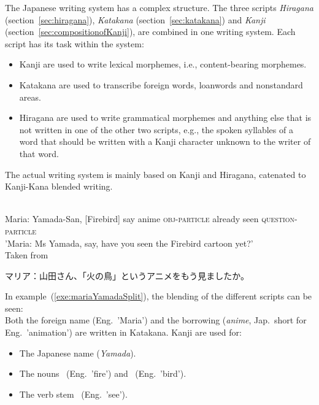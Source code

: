 The Japanese writing system has a complex structure. The three scripts 
\emph{Hiragana} (section~\ref{sec:hiragana}),
\emph{Katakana} (section~\ref{sec:katakana}) and
\emph{Kanji} (section~\ref{sec:compositionofKanji}),
are combined in one writing system. Each script has its task within the system:
\begin{itemize}

  \item Kanji are used to write lexical morphemes, i.e., content-bearing morphemes.

  \item Katakana are used to transcribe foreign words, loanwords and 
        nonstandard areas.

  \item Hiragana are used to write grammatical morphemes and anything else that
        is not written in one of the other two scripts, e.g., the spoken syllables
        of a word that should be written with a Kanji character unknown to the 
        writer of that word.
\end{itemize}
The actual writing system is mainly based on Kanji and Hiragana, catenated to
Kanji-Kana blended writing.
\begin{exe}
\ex\label{exe:mariaYamada}
\begin{xlist}
\ex \label{exe:mariaYamadaSplit}
\gll 
  \\
 Maria: Yamada-San, [Firebird] say anime \textsc{obj-particle} already seen \textsc{question-particle} \\
\trans 'Maria: Ms Yamada, say, have you seen the Firebird cartoon yet?' \\
Taken from~
\ex\label{exe:mariaYamadaFull}
 \begin{CJK} 
  マリア：山田さん、「火の鳥」というアニメをもう見ましたか。
 \end{CJK}
\end{xlist}
\end{exe}
In example~(\ref{exe:mariaYamadaSplit}), the blending of the different scripts 
can be seen:\\
Both the foreign name   (Eng.\ 'Maria') and the borrowing 
 (\emph{anime}, Jap.\ short for Eng.\ 'animation') are written in 
Katakana. Kanji are used for:
\begin{itemize}
\item The Japanese name  (\emph{Yamada}).
\item The nouns ~(Eng.\ 'fire') and 
      ~(Eng.\ 'bird').
\item The verb stem ~(Eng.\ 'see').
\end{itemize}

